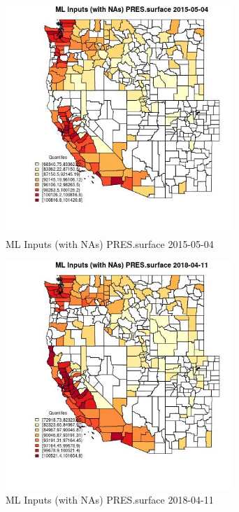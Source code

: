 \begin{figure} 
\centering  
\includegraphics[width=0.77\textwidth]{Code_Outputs/Report_ML_input_PM25_Step4_part_e_de_duplicated_aves_compiled_2019-05-18wNAs_CountyPRESsurfaceMean2015-05-04_2015-05-04.jpg} 
\caption{\label{fig:Report_ML_input_PM25_Step4_part_e_de_duplicated_aves_compiled_2019-05-18wNAsCountyPRESsurfaceMean2015-05-04_2015-05-04}ML Inputs (with NAs) PRES.surface 2015-05-04} 
\end{figure} 
 

\begin{figure} 
\centering  
\includegraphics[width=0.77\textwidth]{Code_Outputs/Report_ML_input_PM25_Step4_part_e_de_duplicated_aves_compiled_2019-05-18wNAs_CountyPRESsurfaceMean2018-04-11_2018-04-11.jpg} 
\caption{\label{fig:Report_ML_input_PM25_Step4_part_e_de_duplicated_aves_compiled_2019-05-18wNAsCountyPRESsurfaceMean2018-04-11_2018-04-11}ML Inputs (with NAs) PRES.surface 2018-04-11} 
\end{figure} 
 

